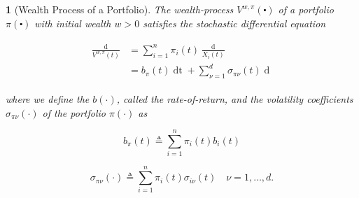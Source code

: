 \documentclass[british]{amsart} \usepackage{lmodern}
\numberwithin{equation}{section} \numberwithin{figure}{section}
\theoremstyle{plain} \newtheorem{thm}{\protect\theoremname}[section]
\theoremstyle{definition} \newtheorem{defn}[thm]{\protect\definitionname}
\theoremstyle{plain} \newtheorem{assumption}[thm]{\protect\assumptionname}
\theoremstyle{plain} \newtheorem{lem}[thm]{\protect\lemmaname}
\theoremstyle{plain} \newtheorem{prop}[thm]{\protect\propositionname}
\theoremstyle{remark} \newtheorem{rem}[thm]{\protect\remarkname}
\theoremstyle{plain} \newtheorem{cor}[thm]{\protect\corollaryname}
\renewcommand{\d}[1]{\mathop{\mathrm{d}{#1}}}
\newcommand{\defeq}{\mathop{\triangleq}} \newcommand{\almostsurely}{\text{a.s.}}
\begin{document}
\begin{prop} [Wealth Process of a Portfolio]

  The wealth-process $V^{w,\pi}(\centerdot)$ of a portfolio $\pi(\centerdot)$
  with initial wealth $w > 0$ satisfies the stochastic differential equation

  \begin{gather}
    \label{eq:arithmeticreturnofportfolio}
    \begin{split}
      \frac{\d{V^{w,\pi}(t)}}{V^{w,\pi}(t)} 
        &= \sum_{i=1}^{n} \pi_{i}(t) \frac{\d{X_{i}(t)}}{X_{i}(t)} \\
        &= b_{\pi}(t)\d{t} + \sum_{\nu=1}^{d} \sigma_{\pi\nu}(t) \d{W_{\nu}(t)}
    \end{split}
  \end{gather}

  where we define the $b(\cdot)$, called the \textit{rate-of-return}, and the
  volatility coefficients $\sigma_{\pi\nu}(\cdot)$ of the portfolio $\pi(\cdot)$ 
  as

  \begin{equation}
    \label{eq:wealthprocessrateofreturn}
    b_{\pi}(t) \defeq \sum_{i=1}^{n} \pi_{i}(t) b_{i}(t)
  \end{equation}

  \begin{equation}
    \label{eq:wealthprocessvolatility}
    \sigma_{\pi\nu}(\cdot) \defeq \sum_{i=1}^{n} \pi_{i}(t) \sigma_{i\nu}(t)
    \quad \nu=1,\dots,d.
  \end{equation}

\end{prop}
\end{document}
